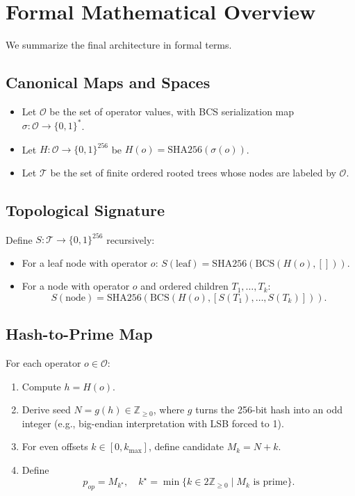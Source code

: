 \documentclass[11pt]{article}
\begin{document}
\section{Formal Mathematical Overview}

We summarize the final architecture in formal terms.

\subsection{Canonical Maps and Spaces}

\begin{itemize}[leftmargin=*]
  \item Let \( \mathcal{O} \) be the set of operator values, with BCS serialization map \( \sigma : \mathcal{O} \to \{0,1\}^* \).
  \item Let \( H : \mathcal{O} \to \{0,1\}^{256} \) be \( H(o) = \mathrm{SHA256}(\sigma(o)) \).
  \item Let \( \mathcal{T} \) be the set of finite ordered rooted trees whose nodes are labeled by \( \mathcal{O} \).
\end{itemize}

\subsection{Topological Signature}

Define \( S : \mathcal{T} \to \{0,1\}^{256} \) recursively:

\begin{itemize}[leftmargin=*]
  \item For a leaf node with operator \( o \): \( S(\text{leaf}) = \mathrm{SHA256}(\mathrm{BCS}(H(o), [])) \).
  \item For a node with operator \( o \) and ordered children \( T_1,\dots,T_k \):
  \[
    S(\text{node}) = \mathrm{SHA256}(\mathrm{BCS}(H(o), [S(T_1), \dots, S(T_k)])).
  \]
\end{itemize}

\subsection{Hash-to-Prime Map}

For each operator \( o \in \mathcal{O} \):

\begin{enumerate}[leftmargin=*]
  \item Compute \( h = H(o) \).
  \item Derive seed \( N = g(h) \in \mathbb{Z}_{\ge 0} \), where \( g \) turns the 256-bit hash into an odd integer (e.g., big-endian interpretation with LSB forced to 1).
  \item For even offsets \( k \in [0, k_{\max}] \), define candidate \( M_k = N + k \).
  \item Define
  \[
    p_{op} = M_{k^\star}, \quad
    k^\star = \min \{ k \in 2\mathbb{Z}_{\ge 0} \mid M_k \text{ is prime} \}.
  \]
\end{enumerate}
\end{document}
